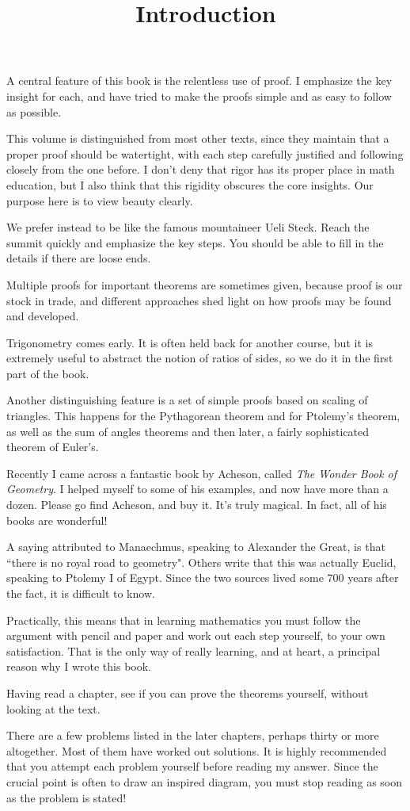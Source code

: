 \documentclass[11pt, oneside]{article}
\title{Introduction}
\date{}
\begin{document}
\maketitle
\Large


\label{sec:additional_notes}

A central feature of this book is the relentless use of proof.  I emphasize the key insight for each, and have tried to make the proofs simple and as easy to follow as possible.

This volume is distinguished from most other texts, since they maintain that a proper proof should be watertight, with each step carefully justified and following closely from the one before.  I don't deny that rigor has its proper place in math education, but I also think that this rigidity obscures the core insights.  Our purpose here is to view beauty clearly.

We prefer instead to be like the famous mountaineer Ueli Steck.  Reach the summit quickly and emphasize the key steps.  You should be able to fill in the details if there are loose ends.

Multiple proofs for important theorems are sometimes given, because proof is our stock in trade, and different approaches shed light on how proofs may be found and developed.

Trigonometry comes early.  It is often held back for another course, but it is extremely useful to abstract the notion of ratios of sides, so we do it in the first part of the book.  

Another distinguishing feature is a set of simple proofs based on scaling of triangles.  This happens for the Pythagorean theorem and for Ptolemy's theorem, as well as the sum of angles theorems and then later, a fairly sophisticated theorem of Euler's.

Recently I came across a fantastic book by Acheson, called \emph{The Wonder Book of Geometry}.  I helped myself to some of his examples, and now have more than a dozen.  Please go find Acheson, and buy it.  It's truly magical.  In fact, all of his books are wonderful!

A saying attributed to Manaechmus, speaking to Alexander the Great, is that ``there is no royal road to geometry".  Others write that this was actually Euclid, speaking to Ptolemy I of Egypt.  Since the two sources lived some 700 years after the fact, it is difficult to know.

Practically, this means that in learning mathematics you must follow the argument with pencil and paper and work out each step yourself, to your own satisfaction.  That is the only way of really learning, and at heart, a principal reason why I wrote this book.  

Having read a chapter, see if you can prove the theorems yourself, without looking at the text.

There are a few problems listed in the later chapters, perhaps thirty or more altogether.  Most of them have worked out solutions.  It is highly recommended that you attempt each problem yourself before reading my answer.  Since the crucial point is often to draw an inspired diagram, you must stop reading as soon as the problem is stated!
\end{document}
